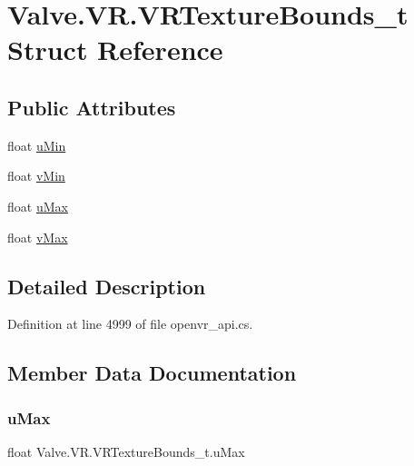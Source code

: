 \hypertarget{struct_valve_1_1_v_r_1_1_v_r_texture_bounds__t}{}\section{Valve.\+V\+R.\+V\+R\+Texture\+Bounds\+\_\+t Struct Reference}
\label{struct_valve_1_1_v_r_1_1_v_r_texture_bounds__t}
\subsection*{Public Attributes}
\begin{DoxyCompactItemize}
\item 
float \mbox{\hyperlink{struct_valve_1_1_v_r_1_1_v_r_texture_bounds__t_acf3246570d44cced89554f62b26fc338}{u\+Min}}
\item 
float \mbox{\hyperlink{struct_valve_1_1_v_r_1_1_v_r_texture_bounds__t_a88fbc926a5f11015254789bc4cc3c25e}{v\+Min}}
\item 
float \mbox{\hyperlink{struct_valve_1_1_v_r_1_1_v_r_texture_bounds__t_a1f3c916aec7bb67e20907429e1c55269}{u\+Max}}
\item 
float \mbox{\hyperlink{struct_valve_1_1_v_r_1_1_v_r_texture_bounds__t_ae807c9a10740b68fbcef3fca1de3ad30}{v\+Max}}
\end{DoxyCompactItemize}


\subsection{Detailed Description}


Definition at line 4999 of file openvr\+\_\+api.\+cs.



\subsection{Member Data Documentation}
\mbox{\label{struct_valve_1_1_v_r_1_1_v_r_texture_bounds__t_a1f3c916aec7bb67e20907429e1c55269}} 
\subsubsection{\texorpdfstring{uMax}{uMax}}
{\footnotesize\ttfamily float Valve.\+V\+R.\+V\+R\+Texture\+Bounds\+\_\+t.\+u\+Max}



